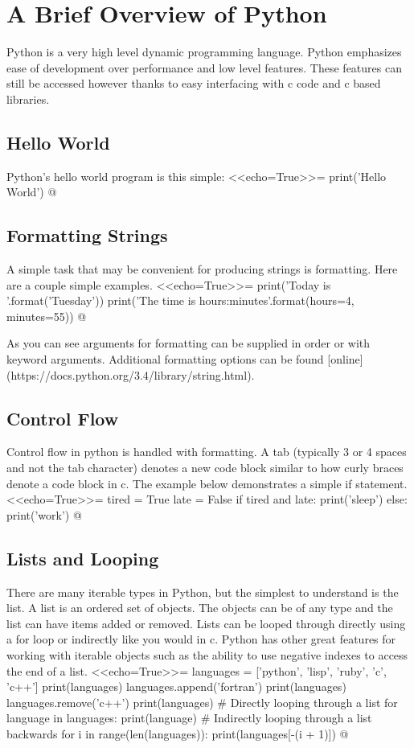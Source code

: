 \documentclass[12pt]{exam}
\begin{document}
\section{A Brief Overview of Python}
Python is a very high level dynamic programming language. Python emphasizes ease of development over performance and low
level features. These features can still be accessed however thanks to easy interfacing with c code and c based
libraries.
\subsection{Hello World}
Python's hello world program is this simple:
<<echo=True>>=
print('Hello World')
@

\subsection{Formatting Strings}
A simple task that may be convenient for producing strings is formatting. Here are a couple simple examples.
<<echo=True>>=
print('Today is {}'.format('Tuesday'))
print('The time is {hours}:{minutes}'.format(hours=4, minutes=55))
@

As you can see arguments for formatting can be supplied in order or with keyword arguments. Additional formatting
options can be found [online](https://docs.python.org/3.4/library/string.html).
\subsection{Control Flow}
Control flow in python is handled with formatting. A tab (typically 3 or 4 spaces and not the tab character) denotes a
new code block similar to how curly braces denote a code block in c. The example below demonstrates a simple if
statement.
<<echo=True>>=
tired = True
late = False
if tired and late:
    print('sleep')
else:
    print('work')
@

\subsection{Lists and Looping}
There are many iterable types in Python, but the simplest to understand is the list. A list is an ordered set of
objects. The objects can be of any type and the list can have items added or removed. Lists can be looped through
directly using a for loop or indirectly like you would in c. Python has other great features for working with iterable
objects such as the ability to use negative indexes to access the end of a list.
<<echo=True>>=
languages = ['python', 'lisp', 'ruby', 'c', 'c++']
print(languages)
languages.append('fortran')
print(languages)
languages.remove('c++')
print(languages)
# Directly looping through a list
for language in languages:
    print(language)
# Indirectly looping through a list backwards
for i in range(len(languages)):
    print(languages[-(i + 1)])
@
\end{document}
